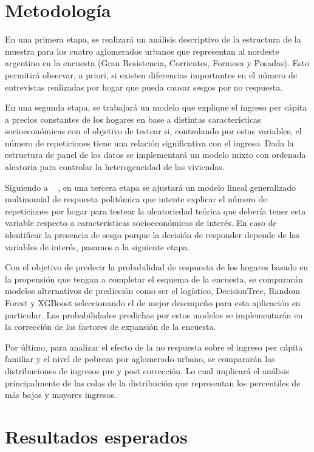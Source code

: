 \documentclass{article}
\begin{document}
\section{Metodología}

En una primera etapa, se realizará un análisis descriptivo de la estructura de la muestra para los cuatro aglomerados urbanos que representan al nordeste argentino en la encuesta (Gran Resistencia, Corrientes, Formosa y Posadas). Esto permitirá observar, a priori, si existen diferencias importantes en el número de entrevistas realizadas por hogar que pueda causar sesgos por no respuesta.

En una segunda etapa, se trabajará un modelo que explique el ingreso per cápita a precios constantes de los hogares en base a distintas características socioeconómicas con el objetivo de testear si, controlando por estas variables, el número de repeticiones tiene una relación significativa con el ingreso. Dada la estructura de panel de los datos se implementará un modelo mixto con ordenada aleatoria para controlar la heterogeneidad de las viviendas.

Siguiendo a ~ \cite{korinek07}, en una tercera etapa se ajustará un modelo lineal generalizado multinomial de respuesta politómica que intente explicar el número de repeticiones por hogar para testear la aleatoriedad teórica que debería tener esta variable respecto a características socioeconómicas de interés. En caso de identificar la presencia de sesgo porque la decisión de responder depende de las variables de interés, pasamos a la siguiente etapa.

Con el objetivo de predecir la probabilidad de respuesta de los hogares basado en la propensión que tengan a completar el esquema de la encuesta, se compararán modelos alternativos de predicción como ser el logístico, DecisionTree, Random Forest y XGBoost seleccionando el de mejor desempeño para esta aplicación en particular. Las probabilidades predichas por estos modelos se implementarán en la corrección de los factores de expansión de la encuesta.

Por último, para analizar el efecto de la no respuesta sobre el ingreso per cápita familiar y el nivel de pobreza por aglomerado urbano, se compararán las distribuciones de ingresos pre y post corrección. Lo cual implicará el análisis principalmente de las colas de la distribución que representan los percentiles de más bajos y mayores ingresos. 

\section{Resultados esperados}

\printbibliography
\end{document}
